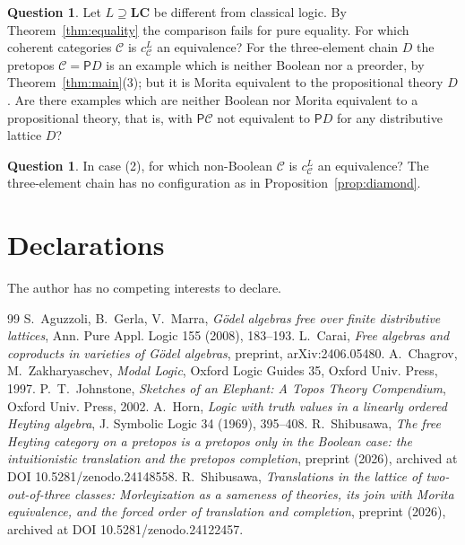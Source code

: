 \documentclass[11pt]{amsart}
\theoremstyle{definition}
\newtheorem{que}[thm]{Question}
\newcommand{\PP}{\mathsf P}
\newcommand{\cC}{\mathcal C}
\newcommand{\LC}{\mathbf{LC}}
\begin{document}
\begin{que}
Let $L\supseteq\LC$ be different from classical logic. By
Theorem~\ref{thm:equality} the comparison fails for pure equality. For
which coherent categories $\cC$ is $c^L_\cC$ an equivalence? For the
three-element chain $D$ the pretopos $\cC=\PP D$ is an example which is
neither Boolean nor a preorder, by Theorem~\ref{thm:main}(3); but it is Morita
equivalent to the propositional theory $D$. Are there examples which
are neither Boolean nor Morita equivalent to a propositional theory,
that is, with $\PP\cC$ not equivalent to $\PP D$ for any distributive
lattice $D$?
\end{que}

\begin{que}
In case \textup{(2)}, for which non-Boolean $\cC$ is $c^L_\cC$ an
equivalence? The three-element chain has no configuration as in
Proposition~\ref{prop:diamond}.
\end{que}

\section*{Declarations}
The author has no competing interests to declare.

\begin{thebibliography}{99}
 S.~Aguzzoli, B.~Gerla, V.~Marra, \emph{G\"odel algebras
free over finite distributive lattices}, Ann. Pure Appl. Logic 155
(2008), 183--193.
 L.~Carai, \emph{Free algebras and coproducts in
varieties of G\"odel algebras}, preprint, arXiv:2406.05480.
 A.~Chagrov, M.~Zakharyaschev, \emph{Modal Logic}, Oxford
Logic Guides 35, Oxford Univ. Press, 1997.
 P.~T.~Johnstone, \emph{Sketches of an Elephant: A Topos
Theory Compendium}, Oxford Univ. Press, 2002.
 A.~Horn, \emph{Logic with truth values in a linearly
ordered Heyting algebra}, J. Symbolic Logic 34 (1969), 395--408.
 R.~Shibusawa, \emph{The free Heyting category on a
pretopos is a pretopos only in the Boolean case: the intuitionistic
translation and the pretopos completion}, preprint (2026), archived at
DOI 10.5281/zenodo.24148558.
 R.~Shibusawa, \emph{Translations in the lattice of
two-out-of-three classes: Morleyization as a sameness of theories, its
join with Morita equivalence, and the forced order of translation and
completion}, preprint (2026), archived at DOI 10.5281/zenodo.24122457.
\end{thebibliography}
\end{document}
